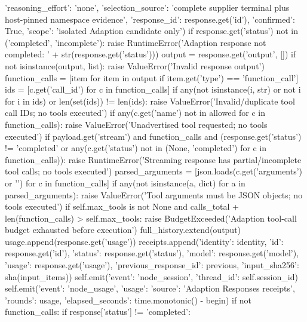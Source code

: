 {{                       'reasoning_effort': 'none',
                       'selection_source': 'complete supplier terminal plus host-pinned namespace evidence',
                       'response_id': response.get('id'), 'confirmed': True,
                       'scope': 'isolated Adaption candidate only'})
            if response.get('status') not in ('completed', 'incomplete'):
                raise RuntimeError('Adaption response not completed: ' + str(response.get('status')))
            output = response.get('output', [])
            if not isinstance(output, list):
                raise ValueError('Invalid response output')
            function_calls = [item for item in output if item.get('type') == 'function_call']
            ids = [c.get('call_id') for c in function_calls]
            if any(not isinstance(i, str) or not i for i in ids) or len(set(ids)) != len(ids):
                raise ValueError('Invalid/duplicate tool call IDs; no tools executed')
            if any(c.get('name') not in allowed for c in function_calls):
                raise ValueError('Unadvertised tool requested; no tools executed')
            if payload.get('stream') and function_calls and (response.get('status') != 'completed' or any(c.get('status') not in (None, 'completed') for c in function_calls)):
                raise RuntimeError('Streaming response has partial/incomplete tool calls; no tools executed')
            parsed_arguments = [json.loads(c.get('arguments') or '{}') for c in function_calls]
            if any(not isinstance(a, dict) for a in parsed_arguments):
                raise ValueError('Tool arguments must be JSON objects; no tools executed')
            if self.max_tools is not None and calls_total + len(function_calls) > self.max_tools:
                raise BudgetExceeded('Adaption tool-call budget exhausted before execution')
            full_history.extend(output)
            usage.append(response.get('usage'))
            receipts.append({'identity': identity, 'id': response.get('id'), 'status': response.get('status'),
                             'model': response.get('model'), 'usage': response.get('usage'),
                             'previous_response_id': previous, 'input_sha256': sha(input_items)})
            self.emit({'event': 'node_session', 'thread_id': self.session_id})
            self.emit({'event': 'node_usage', 'usage': {'source': 'Adaption Responses receipts', 'rounds': usage},
                       'elapsed_seconds': time.monotonic() - begin})
            if not function_calls:
                if response['status'] != 'completed':
}
